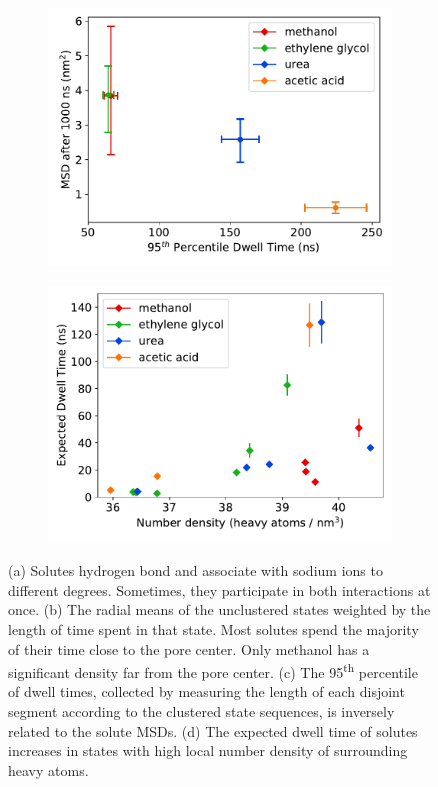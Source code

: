 \documentclass[journal=jpcbfk,manuscript=article]{achemso}
\begin{document}
\begin{figure}
\begin{subfigure}{0.49\textwidth}
  \includegraphics[width=\textwidth]{dwell_time_summary.pdf}
  \caption{}\label{fig:dwell_time_summary}
  \end{subfigure}
  \begin{subfigure}{0.49\textwidth}
  \includegraphics[width=\textwidth]{density_comparison.pdf}
  \caption{}\label{fig:density_comparison}
  \end{subfigure}
  \caption{(a) Solutes hydrogen bond and associate with sodium ions
  to different degrees. Sometimes, they participate in both interactions at
  once. (b) The radial means of the unclustered states weighted
  by the length of time spent in that state. Most solutes spend the majority of
  their time close to the pore center. Only methanol has a significant density
  far from the pore center. (c) The 95\textsuperscript{th} percentile of dwell
  times, collected by measuring the length of each disjoint segment according 
  to the clustered state sequences, is inversely related to the solute MSDs.
  (d) The expected dwell time of solutes increases in states with high local 
  number density of surrounding heavy atoms.
  }\label{fig:summaries}
  \end{figure}
  
\end{document}
